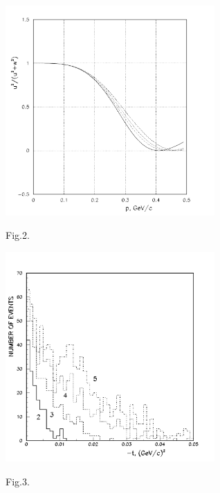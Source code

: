 \documentclass[a4paper,12pt]{article}
\begin{document}
    \begin{figure}[hbt]
      \begin{center}
        \includegraphics[width=8cm]{wavedtr.pdf}
      \end{center}
      \vspace{0.4mm}
      Fig.2.
    \end{figure}
    \newpage
    \newpage
    \begin{figure}[hbt]
      \begin{center}
        \includegraphics[width=8cm]{tpp2345.pdf}
      \end{center}
      \vspace {0,4cm}
      Fig.3.
    \end {figure}
\end{document}

